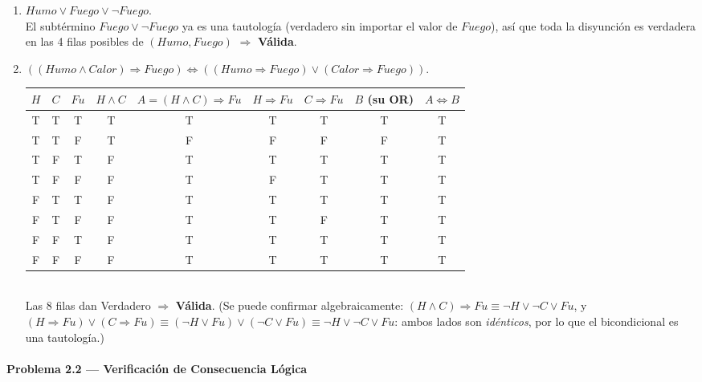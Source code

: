 \begin{enumerate}
    \item $Humo \lor Fuego \lor \neg Fuego$.\\
    El subtérmino $Fuego \lor \neg Fuego$ ya es una tautología (verdadero sin importar el valor de
    $Fuego$), así que toda la disyunción es verdadera en las 4 filas posibles de $(Humo,Fuego)$
    $\Rightarrow$ \textbf{Válida}.

    \item $((Humo \land Calor) \Rightarrow Fuego) \Leftrightarrow ((Humo \Rightarrow Fuego) \lor
    (Calor \Rightarrow Fuego))$.\\
    \begin{tabular}{ccccccccc}
        \toprule
        $H$ & $C$ & $Fu$ & $H\land C$ & $A=(H\land C)\Rightarrow Fu$ & $H\Rightarrow Fu$ & $C\Rightarrow Fu$ & $B$ (su OR) & $A\Leftrightarrow B$\\
        \midrule
        T&T&T&T&T&T&T&T&T\\
        T&T&F&T&F&F&F&F&T\\
        T&F&T&F&T&T&T&T&T\\
        T&F&F&F&T&F&T&T&T\\
        F&T&T&F&T&T&T&T&T\\
        F&T&F&F&T&T&F&T&T\\
        F&F&T&F&T&T&T&T&T\\
        F&F&F&F&T&T&T&T&T\\
        \bottomrule
    \end{tabular}\\
    Las 8 filas dan Verdadero $\Rightarrow$ \textbf{Válida}. (Se puede confirmar algebraicamente:
    $(H\land C)\Rightarrow Fu \equiv \neg H \lor \neg C \lor Fu$, y $(H\Rightarrow Fu)\lor(C\Rightarrow
    Fu) \equiv (\neg H\lor Fu)\lor(\neg C\lor Fu) \equiv \neg H\lor\neg C\lor Fu$: ambos lados son
    \emph{idénticos}, por lo que el bicondicional es una tautología.)
\end{enumerate}

\paragraph{Problema 2.2 --- Verificación de Consecuencia Lógica}

